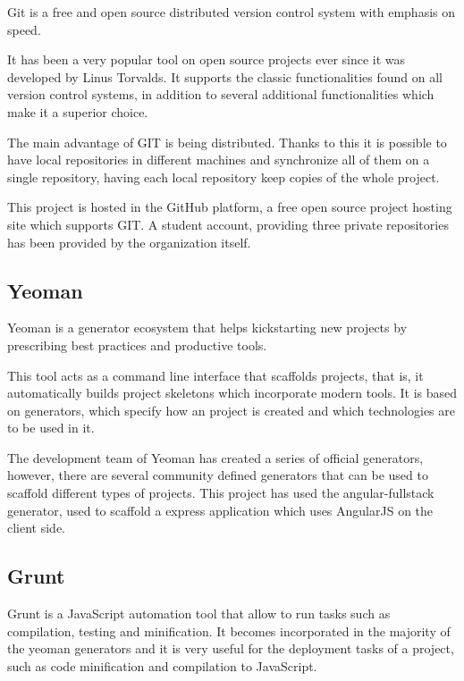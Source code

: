 Git \cite{git} is a free and open source distributed version control system with emphasis on speed. 

It has been a very popular tool on open source projects ever since it was developed by Linus Torvalds. It supports the classic functionalities found on all version control systems, in addition to several additional functionalities which make it a superior choice.

The main advantage of GIT is being distributed. Thanks to this it is possible to have local repositories in different machines and synchronize all of them on a single repository, having each local repository keep copies of the whole project.

This project is hosted in the GitHub platform, a free open source project hosting site which supports GIT. A student account, providing three private repositories has been provided by the organization itself.

\subsection{Yeoman}

Yeoman \cite{yo} is a generator ecosystem that helps kickstarting new projects by prescribing best practices and productive tools. 

This tool acts as a command line interface that scaffolds projects, that is, it automatically builds project skeletons which incorporate modern tools. It is based on generators, which specify how an project is created and which technologies are to be used in it.

The development team of Yeoman has created a series of official generators, however, there are several community defined generators that can be used to scaffold different types of projects. This project has used the angular-fullstack generator, used to scaffold a express application which uses AngularJS on the client side.

\subsection{Grunt}

Grunt \cite{grunt} is a JavaScript automation tool that allow to run tasks such as compilation, testing and minification. It becomes incorporated in the majority of the yeoman generators and it is very useful for the deployment tasks of a project, such as code minification and compilation to JavaScript.

